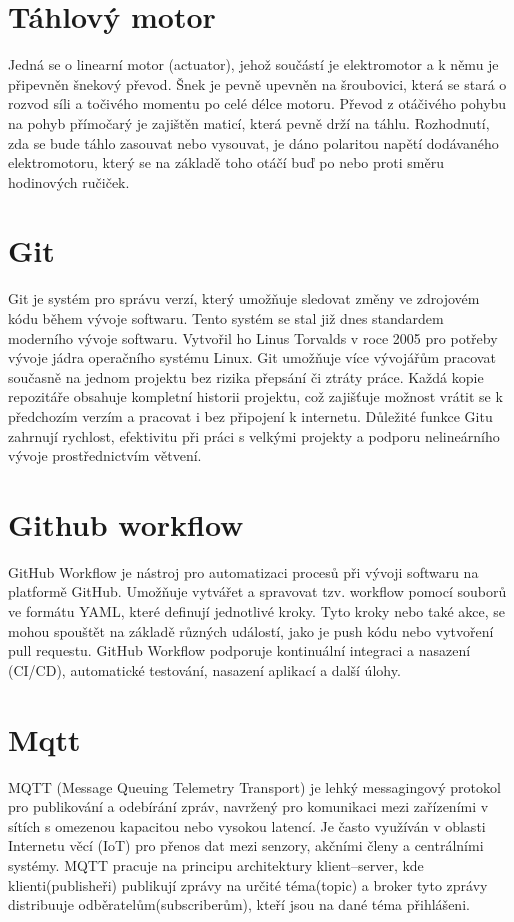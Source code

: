 \section*{Táhlový motor}\label{sec:tahlovy-motor}
Jedná se o linearní motor (actuator), jehož součástí je elektromotor a k němu je připevněn šnekový převod.
Šnek je pevně upevněn na šroubovici, která se stará o rozvod síli a točivého momentu po celé délce motoru.
Převod z otáčivého pohybu na pohyb přímočarý je zajištěn maticí, která pevně drží na táhlu.
Rozhodnutí, zda se bude táhlo zasouvat nebo vysouvat, je dáno polaritou napětí dodávaného elektromotoru, který se na základě toho otáčí buď po nebo proti směru hodinových ručiček.

\section*{Git}\label{sec:git}
Git je systém pro správu verzí, který umožňuje sledovat změny ve zdrojovém kódu během vývoje softwaru.
Tento systém se stal již dnes standardem moderního vývoje softwaru.
Vytvořil ho Linus Torvalds v roce 2005 pro potřeby vývoje jádra operačního systému Linux.
Git umožňuje více vývojářům pracovat současně na jednom projektu bez rizika přepsání či ztráty práce.
Každá kopie repozitáře obsahuje kompletní historii projektu, což zajišťuje možnost vrátit se k předchozím verzím a pracovat i bez připojení k internetu.
Důležité funkce Gitu zahrnují rychlost, efektivitu při práci s velkými projekty a podporu nelineárního vývoje prostřednictvím větvení.


\section*{Github workflow}\label{sec:github-workflow}
GitHub Workflow je nástroj pro automatizaci procesů při vývoji softwaru na platformě GitHub.
Umožňuje vytvářet a spravovat tzv. workflow pomocí souborů ve formátu YAML, které definují jednotlivé kroky.
Tyto kroky nebo také akce, se mohou spouštět na základě různých událostí, jako je push kódu nebo vytvoření pull requestu.
GitHub Workflow podporuje kontinuální integraci a nasazení (CI/CD), automatické testování, nasazení aplikací a další úlohy.


\section*{Mqtt}\label{sec:mqtt}
MQTT (Message Queuing Telemetry Transport) je lehký messagingový protokol pro publikování a odebírání zpráv, navržený pro komunikaci mezi zařízeními v sítích s omezenou kapacitou nebo vysokou latencí.
Je často využíván v oblasti Internetu věcí (IoT) pro přenos dat mezi senzory, akčními členy a centrálními systémy.
MQTT pracuje na principu architektury klient–server, kde klienti(publisheři) publikují zprávy na určité téma(topic) a broker tyto zprávy distribuuje odběratelům(subscriberům), kteří jsou na dané téma přihlášeni.


